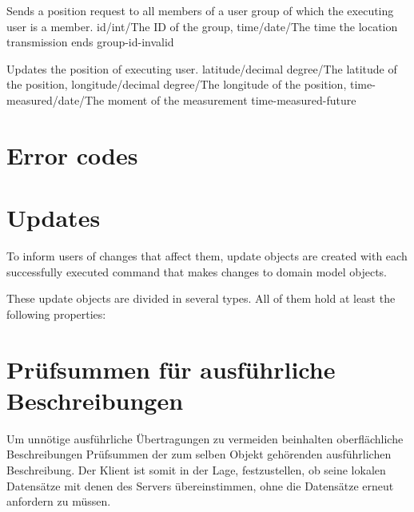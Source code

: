 \documentclass[parskip=full,11pt]{scrartcl}
\begin{document}
{Sends a position request to all members of a user group of which the executing
user is a member.}
{id/int/The ID of the group,
time/date/The time the location transmission ends}
{}
{group-id-invalid}
{}

{Updates the position of executing user.}
{latitude/decimal degree/The latitude of the position,
longitude/decimal degree/The longitude of the position,
time-measured/date/The moment of the measurement}
{}
{time-measured-future}
{}

\section{Error codes}\label{sec:errorcodes}
\apiErrorTable

\section{Updates}
To inform users of changes that affect them, update objects are created with
each successfully executed command that makes changes to domain model objects.

These update objects are divided in several types. All of them hold at least
the following properties:




\section{Prüfsummen für ausführliche Beschreibungen}\label{sec:checksum}
\newcommand{\hashAlg}{MD5}
Um unnötige ausführliche Übertragungen zu vermeiden beinhalten oberflächliche
Beschreibungen Prüfsummen der zum selben Objekt gehörenden ausführlichen
Beschreibung.
Der Klient ist somit in der Lage, festzustellen, ob seine lokalen Datensätze
mit denen des Servers übereinstimmen, ohne die Datensätze erneut anfordern zu
müssen.
\end{document}

